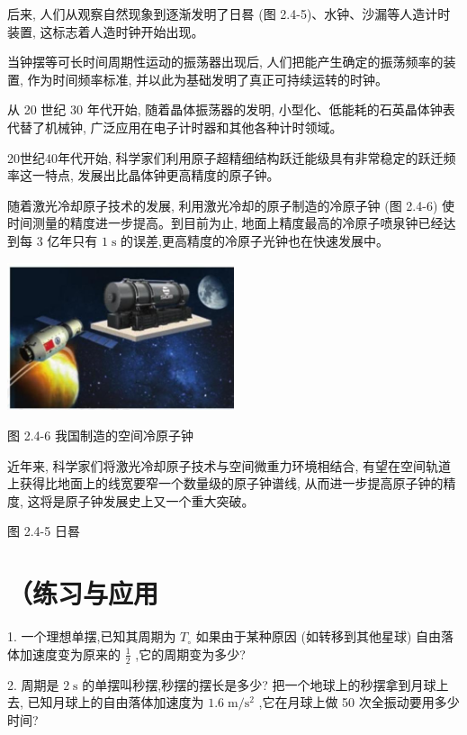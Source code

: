 \documentclass[10pt]{article}
\begin{document}
后来, 人们从观察自然现象到逐渐发明了日晷 (图 2.4-5)、水钟、沙漏等人造计时装置, 这标志着人造时钟开始出现。

当钟摆等可长时间周期性运动的振荡器出现后, 人们把能产生确定的振荡频率的装置, 作为时间频率标准, 并以此为基础发明了真正可持续运转的时钟。

从 20 世纪 30 年代开始, 随着晶体振荡器的发明, 小型化、低能耗的石英晶体钟表代替了机械钟, 广泛应用在电子计时器和其他各种计时领域。

20世纪40年代开始, 科学家们利用原子超精细结构跃迁能级具有非常稳定的跃迁频率这一特点, 发展出比晶体钟更高精度的原子钟。

随着激光冷却原子技术的发展, 利用激光冷却的原子制造的冷原子钟 (图 2.4-6) 使时间测量的精度进一步提高。到目前为止, 地面上精度最高的冷原子喷泉钟已经达到每 3 亿年只有 \(1\mathrm{\;s}\) 的误差,更高精度的冷原子光钟也在快速发展中。

\begin{center}
\includegraphics[max width=0.5\textwidth]{images/01910e4c-ebb8-7d2c-8f2f-2375bc1d2d12_54_412953.jpg}
\end{center}

图 2.4-6 我国制造的空间冷原子钟

近年来, 科学家们将激光冷却原子技术与空间微重力环境相结合, 有望在空间轨道上获得比地面上的线宽要窄一个数量级的原子钟谱线, 从而进一步提高原子钟的精度, 这将是原子钟发展史上又一个重大突破。

图 2.4-5 日晷

\section*{（练习与应用}

1. 一个理想单摆,已知其周期为 \({T}_{ \circ }\) 如果由于某种原因 (如转移到其他星球) 自由落体加速度变为原来的 \(\frac{1}{2}\) ,它的周期变为多少?

2. 周期是 \(2\mathrm{\;s}\) 的单摆叫秒摆,秒摆的摆长是多少? 把一个地球上的秒摆拿到月球上去, 已知月球上的自由落体加速度为 \({1.6}\mathrm{\;m}/{\mathrm{s}}^{2}\) ,它在月球上做 50 次全振动要用多少时间?
\end{document}
